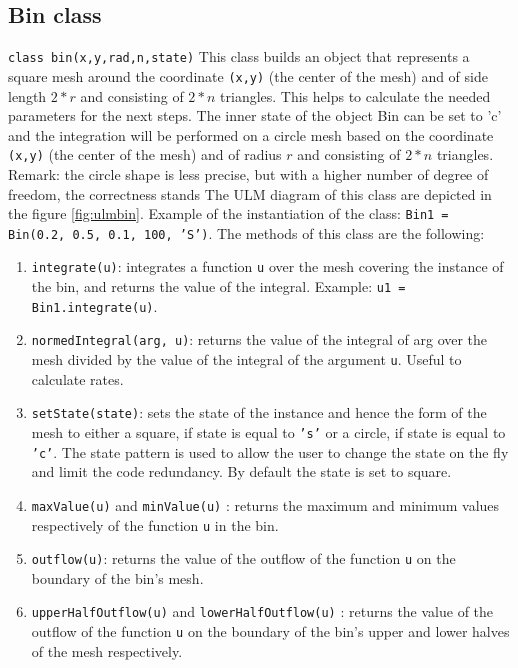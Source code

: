 \documentclass[11pt, oneside]{article}   	%
\begin{document}
\subsection{Bin class}
\texttt{class bin(x,y,rad,n,state)}
\newline
This class builds an object that represents a square mesh around the coordinate \texttt{(x,y)} (the center of the mesh) and of side length $2*r$ and consisting of $2*n$ triangles. This helps to calculate the needed parameters for the next steps. 
\newline
The inner state of the object Bin can be set to 'c' and the integration will be performed on a circle mesh based on the coordinate \texttt{(x,y)} (the center of the mesh) and of radius $r$ and consisting of $2*n$ triangles.
\newline
Remark: the circle shape is less precise, but with a higher number of degree of freedom, the correctness stands
\newline
The ULM diagram of this class are depicted in the figure \ref{fig:ulmbin}. Example of the instantiation of the class: \texttt{Bin1 = Bin(0.2, 0.5, 0.1, 100, 'S')}.
\newline
The methods of this class are the following:
\begin{enumerate}
\item{\texttt{integrate(u)}}: integrates a function \texttt{u} over the mesh covering the instance of the bin, and returns the value of the integral. Example: \texttt{u1 = Bin1.integrate(u)}.
\item{\texttt{normedIntegral(arg, u)}}: returns the value of the integral of arg over the mesh divided by the value of the integral of the argument \texttt{u}. Useful to calculate rates.
\item{\texttt{setState(state)}}: sets the state of the instance and hence the form of the mesh to either a square, if state is equal to \texttt{'s'} or a circle, if state is equal to \texttt{'c'}. The state pattern is used to allow the user to change the state on the fly and limit the code redundancy. By default the state is set to square.
\item{\texttt{maxValue(u)} and \texttt{minValue(u)} }: returns the maximum and minimum values respectively of the function \texttt{u} in the bin.
\item{\texttt{outflow(u)}}: returns the value of the outflow of the function \texttt{u} on the boundary of the bin's mesh.
\item{\texttt{upperHalfOutflow(u)} and \texttt{lowerHalfOutflow(u)} }: returns the value of the outflow of the function \texttt{u} on the boundary of the bin's upper and lower halves of the mesh respectively.
\end{enumerate}
\end{document}
